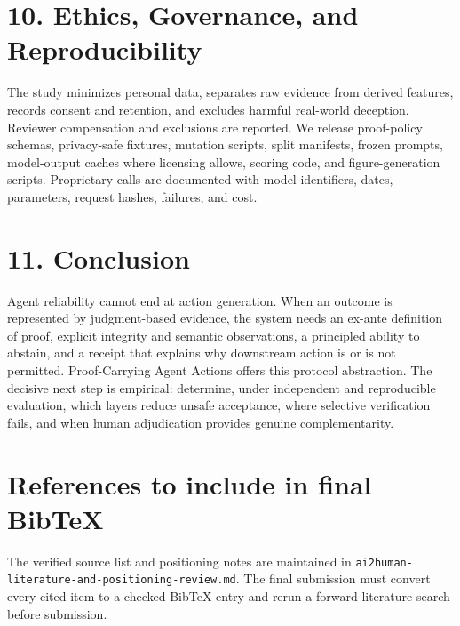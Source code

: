 \documentclass[11pt]{article}
\begin{document}
\section{10. Ethics, Governance, and Reproducibility}

The study minimizes personal data, separates raw evidence from derived features, records consent and retention, and excludes harmful real-world deception. Reviewer compensation and exclusions are reported. We release proof-policy schemas, privacy-safe fixtures, mutation scripts, split manifests, frozen prompts, model-output caches where licensing allows, scoring code, and figure-generation scripts. Proprietary calls are documented with model identifiers, dates, parameters, request hashes, failures, and cost.\par

\section{11. Conclusion}

Agent reliability cannot end at action generation. When an outcome is represented by judgment-based evidence, the system needs an ex-ante definition of proof, explicit integrity and semantic observations, a principled ability to abstain, and a receipt that explains why downstream action is or is not permitted. Proof-Carrying Agent Actions offers this protocol abstraction. The decisive next step is empirical: determine, under independent and reproducible evaluation, which layers reduce unsafe acceptance, where selective verification fails, and when human adjudication provides genuine complementarity.\par

\section{References to include in final BibTeX}

The verified source list and positioning notes are maintained in \texttt{ai2human-literature-and-positioning-review.md}. The final submission must convert every cited item to a checked BibTeX entry and rerun a forward literature search before submission.\par
\end{document}
